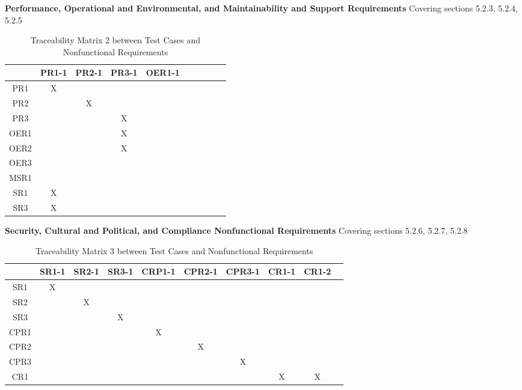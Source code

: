 \documentclass[12pt, titlepage]{article}
\begin{document}
\noindent \textbf{Performance, Operational and Environmental, and Maintainability and Support Requirements}
Covering sections 5.2.3, 5.2.4, 5.2.5
\begin{table}[H]
    \tiny
    \centering
    \begin{tabular}{|c|c|c|c|c|c|c|c|c|c|}
        \hline
        &    PR1-1&PR2-1&PR3-1&OER1-1\\ \hline
        PR1 &    X&     &     &      \\ \hline
        PR2 &     &    X&     &      \\ \hline
        PR3 &     &     &    X&      \\ \hline
        OER1&     &     &    X&      \\ \hline
        OER2&     &     &    X&      \\ \hline
        OER3&     &     &     &      \\ \hline
        MSR1&     &     &     &      \\ \hline
        SR1 &    X&     &     &      \\ \hline
        SR3 &    X&     &     &      \\ \hline
    \end{tabular}
    \caption{Traceability Matrix 2 between Test Cases and Nonfunctional Requirements}
\end{table}

\noindent \textbf{Security, Cultural and Political, and Compliance Nonfunctional Requirements}
Covering sections 5.2.6, 5.2.7, 5.2.8
\begin{table}[H]
    \tiny
    \centering
    \begin{tabular}{|c|c|c|c|c|c|c|c|c|c|}
        \hline
        &    SR1-1&SR2-1&SR3-1&CRP1-1&CPR2-1&CPR3-1&CR1-1&CR1-2\\ \hline
        SR1 &    X&     &     &      &      &      &     &\\ \hline
        SR2 &     &    X&     &      &      &      &     &\\ \hline
        SR3 &     &     &    X&      &      &      &     &\\ \hline
        CPR1&     &     &     &     X&      &      &     &\\ \hline
        CPR2&     &     &     &      &     X&      &     &\\ \hline
        CPR3&     &     &     &      &      &     X&     &\\ \hline
        CR1 &     &     &     &      &      &      &    X&X\\ \hline
    \end{tabular}
    \caption{Traceability Matrix 3 between Test Cases and Nonfunctional Requirements}
\end{table}
\end{document}

